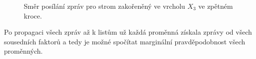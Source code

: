 \begin{figure}[H]
\begin{center}
\end{center}
\caption{Směr posílání zpráv pro strom zakořeněný ve vrcholu $X_3$ ve zpětném kroce.}
\end{figure}

Po propagaci všech zpráv až k listům už každá proměnná získala zprávy od všech sousedních faktorů a tedy je možné spočítat marginální pravděpodobnost všech proměnných.
